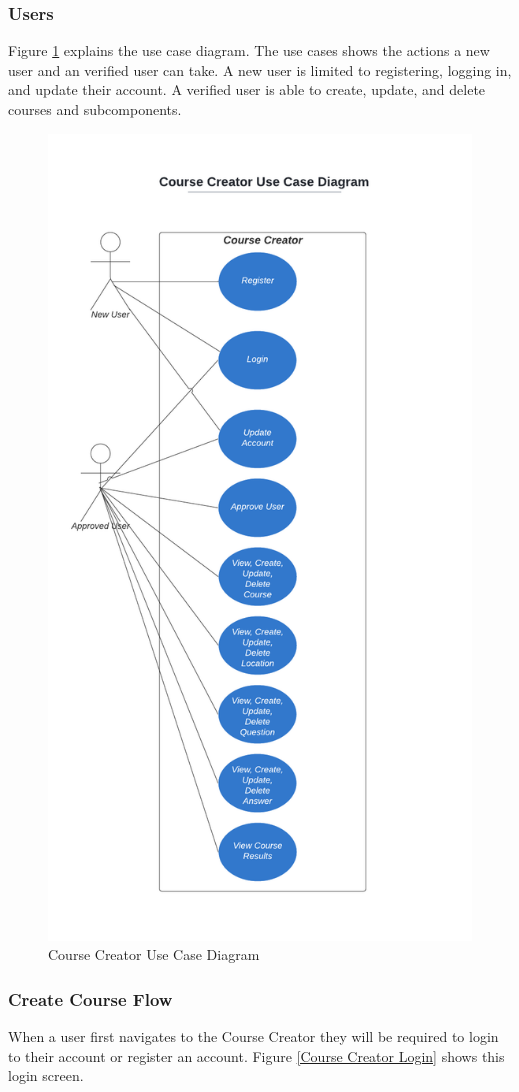 \subsubsection{Users}
Figure \ref{Course Creator Use Case Diagram} explains the use case diagram. The use cases shows the actions a new user and an verified user can take. A new user is limited to registering, logging in, and update their account. A verified user is able to create, update, and delete courses and subcomponents.
\begin{figure}[htb]
	\centering
	\includegraphics[width=.5\textwidth]{Requirements/assets/course-creator-use-case-diagram.png}
	\caption[Course Creator Use Case Diagram]{\label{Course Creator Use Case Diagram}Course Creator Use Case Diagram}
\end{figure}
\clearpage
\subsubsection{Create Course Flow}
When a user first navigates to the Course Creator they will be required to login to their account or register an account. Figure \ref{Course Creator Login} shows this login screen. \\

